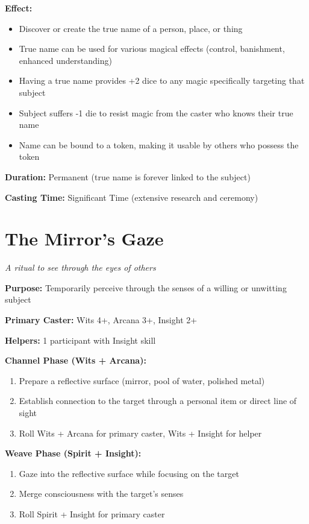 \textbf{Effect:}
\begin{itemize}
\item Discover or create the true name of a person, place, or thing
\item True name can be used for various magical effects (control, banishment, enhanced understanding)
\item Having a true name provides +2 dice to any magic specifically targeting that subject
\item Subject suffers -1 die to resist magic from the caster who knows their true name
\item Name can be bound to a token, making it usable by others who possess the token
\end{itemize}

\textbf{Duration:} Permanent (true name is forever linked to the subject)

\textbf{Casting Time:} Significant Time (extensive research and ceremony)

\section*{The Mirror's Gaze}
\textit{A ritual to see through the eyes of others}

\textbf{Purpose:} Temporarily perceive through the senses of a willing or unwitting subject

\textbf{Primary Caster:} Wits 4+, Arcana 3+, Insight 2+

\textbf{Helpers:} 1 participant with Insight skill

\textbf{Channel Phase (Wits + Arcana):}
\begin{enumerate}
\item Prepare a reflective surface (mirror, pool of water, polished metal)
\item Establish connection to the target through a personal item or direct line of sight
\item Roll Wits + Arcana for primary caster, Wits + Insight for helper
\end{enumerate}

\textbf{Weave Phase (Spirit + Insight):}
\begin{enumerate}
\item Gaze into the reflective surface while focusing on the target
\item Merge consciousness with the target's senses
\item Roll Spirit + Insight for primary caster
\end{enumerate}

